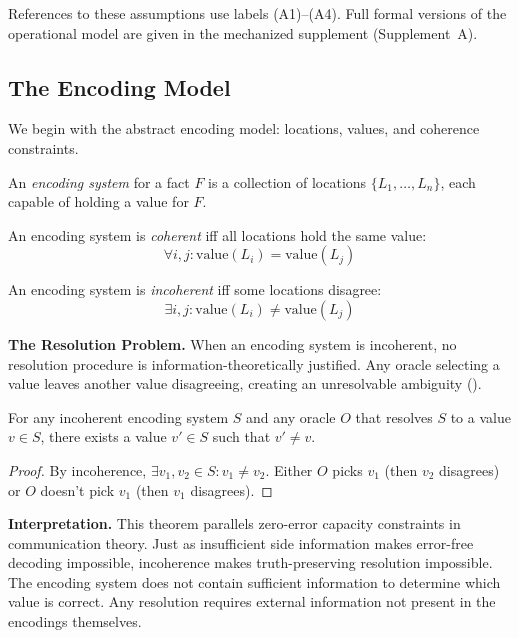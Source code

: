 References to these assumptions use labels (A1)--(A4). Full formal versions of the operational model are given in the mechanized supplement (Supplement~A).

\subsection{The Encoding Model}\label{sec:epistemic}

We begin with the abstract encoding model: locations, values, and coherence constraints.

\begin{definition}\label{def:encoding-system}
An \emph{encoding system} for a fact $F$ is a collection of locations $\{L_1, \ldots, L_n\}$, each capable of holding a value for $F$.
\end{definition}

\begin{definition}[Coherence]\label{def:coherence}
An encoding system is \emph{coherent} iff all locations hold the same value:
\[
\forall i, j: \text{value}(L_i) = \text{value}(L_j)
\]
\end{definition}

\begin{definition}[Incoherence]\label{def:incoherence}
An encoding system is \emph{incoherent} iff some locations disagree:
\[
\exists i, j: \text{value}(L_i) \neq \text{value}(L_j)
\]
\end{definition}

\textbf{The Resolution Problem.} When an encoding system is incoherent, no resolution procedure is information-theoretically justified. Any oracle selecting a value leaves another value disagreeing, creating an unresolvable ambiguity ().

\begin{theorem}\label{thm:oracle-arbitrary}
For any incoherent encoding system $S$ and any oracle $O$ that resolves $S$ to a value $v \in S$, there exists a value $v' \in S$ such that $v' \neq v$.
\end{theorem}

\begin{proof}
By incoherence, $\exists v_1, v_2 \in S: v_1 \neq v_2$. Either $O$ picks $v_1$ (then $v_2$ disagrees) or $O$ doesn't pick $v_1$ (then $v_1$ disagrees).
\end{proof}

\textbf{Interpretation.} This theorem parallels zero-error capacity constraints in communication theory. Just as insufficient side information makes error-free decoding impossible, incoherence makes truth-preserving resolution impossible. The encoding system does not contain sufficient information to determine which value is correct. Any resolution requires external information not present in the encodings themselves.

